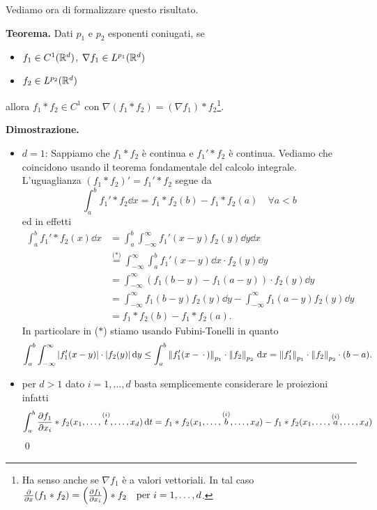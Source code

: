 Vediamo ora di formalizzare questo risultato.

\textbf{Teorema.}
Dati $p_1$ e $p_2$ esponenti coniugati, se

\begin{itemize}
	\item $f_1 \in C^1(\mathbb R^d)$, $\nabla f_1 \in L^{p_1}(\mathbb R^d)$

	\item $f_2 \in L^{p_2}(\mathbb R^d)$ 
\end{itemize}

allora $f_1 \ast f_2 \in C^1$ con $\nabla(f_1 \ast f_2) = (\nabla f_1) \ast f_2$\footnote{Ha senso anche se $\nabla f_1$ è a valori vettoriali. In tal caso  $\frac{\partial}{\partial x}(f_1 \ast f_2) = \left( \frac{\partial f_1}{\partial x_i} \right) \ast f_2 
		\quad \text{per } i = 1, \dots, d $.}. 

\textbf{Dimostrazione.}
\begin{itemize}
	\item $d = 1$:
		Sappiamo che $f_1 \ast f_2$ è continua e $f_1' \ast f_2$ è continua. Vediamo che coincidono usando il teorema fondamentale del calcolo integrale. L'uguaglianza $(f_1 \ast f_2)' = f_1' \ast f_2$ segue da
		$$
		\int_a^b f_1' \ast f_2 \dd x = f_1 \ast f_2(b) - f_1 \ast f_2(a)
		\quad \forall a < b
		$$
		ed in effetti
		$$
		\begin{aligned}
			\int_a^b f_1' \ast f_2 (x) \dd x
			&= \int_a^b \int_{-\infty}^\infty f_1'(x - y) f_2(y) \dd y \dd x \\
			&\overset{\text{($*$)}}{=} \int_{-\infty}^\infty \int_a^b f_1'(x - y) \dd x \cdot f_2(y) \dd y \\
			&= \int_{-\infty}^\infty (f_1(b - y) - f_1(a - y)) \cdot f_2(y) \dd y \\
			&= \int_{-\infty}^\infty f_1(b - y) f_2(y) \dd y - \int_{-\infty}^\infty f_1(a - y) f_2(y) \dd y \\
			&= f_1 \ast f_2(b) - f_1 \ast f_2(a).
		\end{aligned}
		$$
		In particolare in ($*$) stiamo usando Fubini-Tonelli in quanto
		$$
		\int_a^b \int_{-\infty}^\infty |f_1'(x-y)| \cdot |f_2(y)| \,\mathrm{d} y
		\leq \int_a^b \left\lVert f_1'(x - \,\cdot\,) \right\rVert_{p_1} \cdot \left\lVert f_2 \right\rVert_{p_2} \,\mathrm{d} x 
		= \left\lVert f_1' \right\rVert_{p_1} \cdot \left\lVert f_2 \right\rVert_{p_2} \cdot (b - a).
		$$

	\item
		per $d > 1$ dato $i = 1, \dots, d$ basta semplicemente considerare le proiezioni infatti
		$$
		\int_a^b \frac{\partial f_1}{\partial x_i} \ast f_2 (x_1, \dots, \overset{\text{($i$)}}{t}, \dots, x_d) \,\mathrm{d} t
		= f_1 \ast f_2 (x_1, \dots, \overset{\text{($i$)}}{b}, \dots, x_d) - f_1 \ast f_2 (x_1, \dots, \overset{\text{($i$)}}{a}, \dots, x_d)
		$$
		\qed
\end{itemize}


